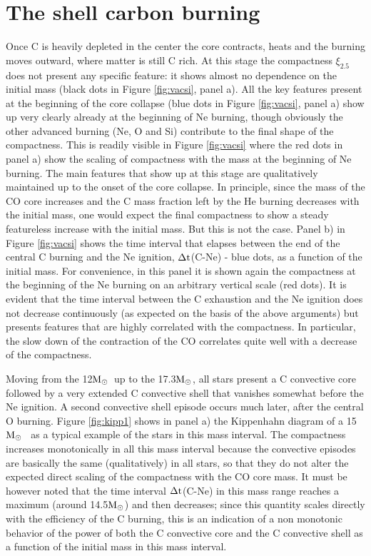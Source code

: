 \documentclass{aastex631}
\newcommand{\msun}{$\rm M_\odot$}
\begin{document}
\section{The shell carbon burning} \label{sec:carshe}
Once C is heavily depleted in the center the core contracts, heats and the burning moves outward, where matter is still C rich. At this stage the compactness $\xi_{2.5}$ does not present any specific feature: it shows almost no dependence on the initial mass (black dots in Figure \ref{fig:vacsi}, panel a). All the key features present at the beginning of the core collapse (blue dots in Figure \ref{fig:vacsi}, panel a)  show up very clearly already at the beginning of Ne burning, though obviously the other advanced burning (Ne, O and Si) contribute to the final shape of the compactness. This is readily visible in Figure \ref{fig:vacsi} where the red dots in panel a) show the scaling of compactness with the mass at the beginning of Ne burning. The main features that show up at this stage are qualitatively maintained up to the onset of the core collapse. In principle, since the mass of the CO core increases and the C mass fraction left by the He burning decreases with the initial mass, one would expect the final compactness to show a steady featureless increase with the initial mass. But this is not the case. Panel b) in Figure \ref{fig:vacsi} shows the time interval that elapses between the end of the central C burning and the Ne ignition, $\rm \Delta t$(C-Ne) - blue dots, as a function of the initial mass. For convenience, in this panel it is shown again the compactness at the beginning of the Ne burning on an arbitrary vertical scale (red dots). It is evident that the time interval between the C exhaustion and the Ne ignition does not decrease continuously (as expected on the basis of the above arguments) but presents features that are highly correlated with the compactness. In particular, the slow down of the contraction of the CO correlates quite well with a decrease of the compactness.

Moving from the 12\msun~up to the 17.3\msun, all stars present a C convective core followed by a very extended C convective shell that vanishes somewhat before the Ne ignition. A second convective shell episode occurs much later, after the central O burning. Figure \ref{fig:kipp1} shows in panel a) the Kippenhahn diagram of a 15\msun~ as a typical example of the stars in this mass interval. The compactness increases monotonically in all this mass interval because the convective episodes are basically the same (qualitatively) in all stars, so that they do not alter the expected direct scaling of the compactness with the CO core mass. It must be however noted that the time interval $\rm \Delta t$(C-Ne) in this mass range reaches a maximum (around 14.5\msun) and then decreases; since this quantity scales directly with the efficiency of the C burning, this is an indication of a non monotonic behavior of the power of both the C convective core and the C convective shell as a function of the initial mass in this mass interval.
\end{document}
